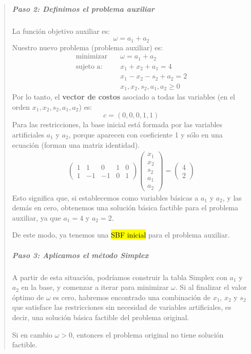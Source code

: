 \begin{quote}
  \subparagraph{Paso 2: Definimos el problema auxiliar}
  
  La función objetivo auxiliar es:
  \[
    \omega = a_1 + a_2
  \]
  Nuestro nuevo problema (problema auxiliar) es:
  \begin{align*}
    \text{minimizar} \quad  &\omega = a_1 + a_2\\[3pt]
    \text{sujeto a:} \quad  &x_1 + x_2 + a_1 = 4\\
                            &x_1 - x_2 - s_2 + a_2 = 2\\
                            &x_1, x_2, s_2, a_1, a_2 \geq 0
  \end{align*}
  Por lo tanto, el \textbf{vector de costos} asociado a todas las variables (en el orden \(x_1, x_2, s_2, a_1, a_2\)) es: 
  \[c = (0, 0, 0, 1, 1)\] 
  Para las restricciones, la base inicial está formada por las variables artificiales \(a_1\) y \(a_2\), porque aparecen con coeficiente 1 y sólo en una ecuación (forman una matriz identidad).
  \begin{align*}
    \begin{pmatrix}
      1 & 1 & 0 & 1 & 0\\
      1 & -1 & -1 & 0 & 1
    \end{pmatrix}
    \begin{pmatrix}
      x_1\\
      x_2\\
      s_2\\
      a_1\\
      a_2
    \end{pmatrix}
    =
    \begin{pmatrix}
      4\\
      2
    \end{pmatrix}
  \end{align*}
  Esto significa que, si establecemos como variables básicas a \(a_1\) y \(a_2\), y las demás en cero, obtenemos una solución básica factible para el problema auxiliar, ya que \(a_1 = 4\) y \(a_2 = 2\).

  De este modo, ya tenemos una \hl{SBF inicial} para el problema auxiliar.
  
  \subparagraph{Paso 3: Aplicamos el método Simplex}
  
  A partir de esta situación, podríamos construir la tabla Simplex con \(a_1\) y \(a_2\) en la base, y comenzar a iterar para minimizar \(\omega\). Si al finalizar el valor óptimo de \(\omega\) es cero, habremos encontrado una combinación de \(x_1\), \(x_2\) y \(s_2\) que satisface las restricciones sin necesidad de variables artificiales, es decir, una solución básica factible del problema original.
  
  Si en cambio \(\omega > 0\), entonces el problema original no tiene solución factible.  
\end{quote}

